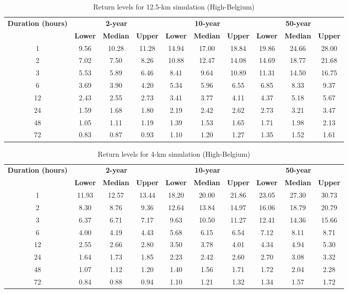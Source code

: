 \begin{table}[p]
\centering
\caption{Return levels for 12.5-km simulation (High-Belgium)}
\label{tab:observations}
\begin{tabular}{c||ccc||ccc||ccc}
\hline
\textbf{Duration (hours)} & \multicolumn{3}{c||}{\textbf{2-year}} & \multicolumn{3}{c||}{\textbf{10-year}} & \multicolumn{3}{c}{\textbf{50-year}} \\
\cline{2-10}
& \textbf{Lower} & \textbf{Median} & \textbf{Upper} & \textbf{Lower} & \textbf{Median} & \textbf{Upper} & \textbf{Lower} & \textbf{Median} & \textbf{Upper} \\
\hline
1 & 9.56 & 10.28 & 11.28 & 14.94 & 17.00 & 18.84 & 19.86 & 24.66 & 28.00 \\
2 & 7.02 & 7.50 & 8.26 & 10.88 & 12.47 & 14.08 & 14.69 & 18.77 & 21.68 \\
3 & 5.53 & 5.89 & 6.46 & 8.41 & 9.64 & 10.89 & 11.31 & 14.50 & 16.75 \\
6 & 3.69 & 3.90 & 4.20 & 5.34 & 5.96 & 6.55 & 6.85 & 8.33 & 9.37 \\
12 & 2.43 & 2.55 & 2.73 & 3.41 & 3.77 & 4.11 & 4.37 & 5.18 & 5.67 \\
24 & 1.59 & 1.68 & 1.80 & 2.19 & 2.42 & 2.62 & 2.73 & 3.21 & 3.47 \\
48 & 1.05 & 1.11 & 1.19 & 1.39 & 1.53 & 1.65 & 1.71 & 1.98 & 2.13 \\
72 & 0.83 & 0.87 & 0.93 & 1.10 & 1.20 & 1.27 & 1.35 & 1.52 & 1.61 \\
\hline
\end{tabular}
\end{table}

\begin{table}[p]
\centering
\caption{Return levels for 4-km simulation (High-Belgium)}
\label{tab:observations}
\begin{tabular}{c||ccc||ccc||ccc}
\hline
\textbf{Duration (hours)} & \multicolumn{3}{c||}{\textbf{2-year}} & \multicolumn{3}{c||}{\textbf{10-year}} & \multicolumn{3}{c}{\textbf{50-year}} \\
\cline{2-10}
& \textbf{Lower} & \textbf{Median} & \textbf{Upper} & \textbf{Lower} & \textbf{Median} & \textbf{Upper} & \textbf{Lower} & \textbf{Median} & \textbf{Upper} \\
\hline
1 & 11.93 & 12.57 & 13.44 & 18.20 & 20.00 & 21.86 & 23.05 & 27.30 & 30.73 \\
2 & 8.30 & 8.76 & 9.36 & 12.64 & 13.84 & 14.97 & 16.06 & 18.79 & 20.79 \\
3 & 6.37 & 6.71 & 7.17 & 9.63 & 10.50 & 11.27 & 12.41 & 14.36 & 15.66 \\
6 & 4.00 & 4.19 & 4.43 & 5.68 & 6.15 & 6.54 & 7.12 & 8.11 & 8.71 \\
12 & 2.55 & 2.66 & 2.80 & 3.50 & 3.78 & 4.01 & 4.34 & 4.94 & 5.30 \\
24 & 1.64 & 1.73 & 1.85 & 2.23 & 2.42 & 2.60 & 2.70 & 3.08 & 3.32 \\
48 & 1.07 & 1.12 & 1.20 & 1.40 & 1.56 & 1.71 & 1.72 & 2.04 & 2.28 \\
72 & 0.84 & 0.88 & 0.94 & 1.10 & 1.21 & 1.32 & 1.34 & 1.57 & 1.72 \\
\hline
\end{tabular}
\end{table}